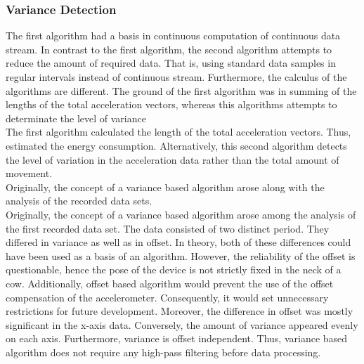\documentclass[english,12pt,a4paper,pdftex,elec,utf8]{aaltothesis}
\begin{document}
\subsubsection{Variance Detection} \label{variancedetectionsection}

The first algorithm had a basis in continuous computation of continuous data stream. In contrast to the first algorithm, the second algorithm attempts to reduce the amount of required data. That is, using standard data samples in regular intervals instead of continuous stream. Furthermore, the calculus of the algorithms are different. The ground of the first algorithm was in summing of the lengths of the total acceleration vectors, whereas this algorithms attempts to determinate the level of variance \\


The first algorithm calculated the length of the total acceleration vectors. Thus, estimated the energy consumption. Alternatively, this second algorithm detects the level of variation in the acceleration data rather than the total amount of movement. \\

Originally, the concept of a variance based algorithm arose along with the analysis of the recorded data sets.  \\


Originally, the concept of a variance based algorithm arose among the analysis of the first recorded data set. The data consisted of two distinct period. They differed in variance as well as in offset. In theory, both of these differences could have been used as a basis of an algorithm. However, the reliability of the offset is questionable, hence the pose of the device is not strictly fixed in the neck of a cow. Additionally, offset based algorithm would prevent the use of the offset compensation of the accelerometer. Consequently, it would set unnecessary restrictions for future development. Moreover, the difference in offset was mostly significant in the x-axis data. Conversely, the amount of variance appeared evenly on each axis. Furthermore, variance is offset independent. Thus, variance based algorithm does not require any high-pass filtering before data processing. \\
\end{document}
